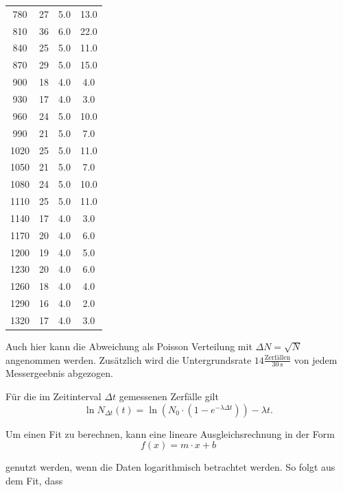 \begin{longtable}{c c c c}
		 780   	&       27  	&  5.0 &       13.0 \\
		 810   	&       36  	&  6.0 &       22.0 \\
		 840   	&       25  	&  5.0 &       11.0 \\
		 870   	&       29  	&  5.0 &       15.0 \\
		 900   	&       18  	&  4.0 &        4.0 \\
		 930   	&       17  	&  4.0 &        3.0 \\
		 960   	&       24  	&  5.0 &       10.0 \\
		 990   	&       21  	&  5.0 &        7.0 \\
		1020   	&       25  	&  5.0 &       11.0 \\
		1050   	&       21  	&  5.0 &        7.0 \\
		1080   	&       24  	&  5.0 &       10.0 \\
		1110   	&       25  	&  5.0 &       11.0 \\
		1140   	&       17  	&  4.0 &        3.0 \\
		1170   	&       20  	&  4.0 &        6.0 \\
		1200   	&       19  	&  4.0 &        5.0 \\
		1230   	&       20  	&  4.0 &        6.0 \\
		1260   	&       18  	&  4.0 &        4.0 \\
		1290   	&       16  	&  4.0 &        2.0 \\
		1320   	&       17  	&  4.0 &        3.0 \\
\end{longtable}
\noindent
Auch hier kann die Abweichung als Poisson Verteilung mit $\Delta N = \sqrt{N}$ angenommen werden. Zusätzlich wird die Untergrundsrate $14 \frac{\text{Zerfällen}}{\SI{30}{\second}}$ von jedem Messergeebnis abgezogen.

Für die im Zeitinterval $\Delta t$ gemessenen Zerfälle gilt
\begin{equation}
	\ln N_{\Delta t}(t) = \ln\left( N_0 \cdot \left(1 - e^{-\lambda \Delta t}\right) \right) - \lambda t.
	\label{eqn:logarithmisch}
\end{equation}
\noindent

Um einen Fit zu berechnen, kann eine lineare Ausgleichsrechnung in der Form
\begin{equation*}
	f(x) = m \cdot x + b
	\label{eqn:mx+b}
\end{equation*}
\noindent

genutzt werden, wenn die Daten logarithmisch betrachtet werden. So folgt aus dem Fit, dass

